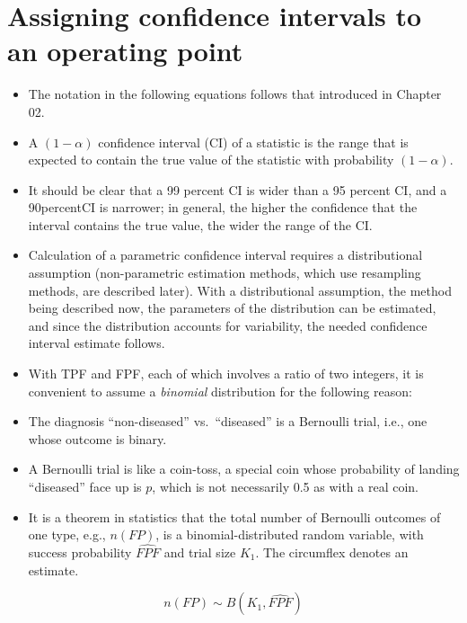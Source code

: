 \documentclass[
]{book}
\providecommand{\tightlist}{%
  \setlength{\itemsep}{0pt}\setlength{\parskip}{0pt}}
\begin{document}
\hypertarget{binary-task-model-confidence-intervals}{%
\section{Assigning confidence intervals to an operating point}\label{binary-task-model-confidence-intervals}}

\begin{itemize}
\tightlist
\item
  The notation in the following equations follows that introduced in Chapter 02.
\item
  A \((1-\alpha)\) confidence interval (CI) of a statistic is the range that is expected to contain the true value of the statistic with probability \((1-\alpha)\).
\item
  It should be clear that a 99 percent CI is wider than a 95 percent CI, and a 90percentCI is narrower; in general, the higher the confidence that the interval contains the true value, the wider the range of the CI.
\item
  Calculation of a parametric confidence interval requires a distributional assumption (non-parametric estimation methods, which use resampling methods, are described later). With a distributional assumption, the method being described now, the parameters of the distribution can be estimated, and since the distribution accounts for variability, the needed confidence interval estimate follows.
\item
  With TPF and FPF, each of which involves a ratio of two integers, it is convenient to assume a \emph{binomial} distribution for the following reason:
\item
  The diagnosis ``non-diseased'' vs.~``diseased'' is a Bernoulli trial, i.e., one whose outcome is binary.
\item
  A Bernoulli trial is like a coin-toss, a special coin whose probability of landing ``diseased'' face up is \(p\), which is not necessarily 0.5 as with a real coin.
\item
  It is a theorem in statistics that the total number of Bernoulli outcomes of one type, e.g., \(n(FP)\), is a binomial-distributed random variable, with success probability \(\widehat{FPF}\) and trial size \(K_1\). The circumflex denotes an estimate.
\end{itemize}

\begin{equation} 
n(FP) \sim B\left ( K_1, \widehat{FPF} \right )
\label{eq:binary-task-model-BinDistrFPF}
\end{equation}
\end{document}

